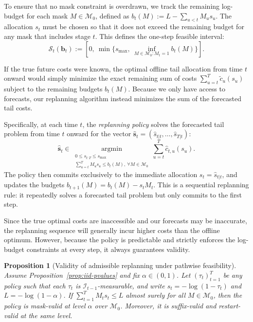 \documentclass{uai2026} %
\newtheorem{proposition}[theorem]{Proposition}
\newcommand{\1}{\mathbf{1}}
\newcommand{\scalt}{\mathcal{S}_{t}}
\newcommand{\mcal}{\mathcal{M}}
\newcommand{\argmin}{\operatorname*{argmin}}
\begin{document}
To ensure that no mask constraint is overdrawn, we track the remaining log-budget for each mask $M\in\mcal_{0}$, defined as $b_t(M) := L - \sum_{u < t} M_u s_u$.
The allocation $s_t$ must be chosen so that it does not exceed the remaining budget for any mask that includes stage $t$.
This defines the one-step feasible interval:
\begin{equation*}
  \scalt(\mathbf{b}_t)
  :=
  [0,\ \min\{s_{\max},\ \inf_{M\in\mcal_{0}: M_t=1} b_t(M)\}].
\end{equation*}

If the true future costs were known, the optimal offline tail allocation from time $t$ onward would simply minimize the exact remaining sum of costs $\sum_{u=t}^T \tilde{c}_u(s_u)$ subject to the remaining budgets $b_t(M)$.
Because we only have access to forecasts, our replanning algorithm instead minimizes the sum of the forecasted tail costs.

Specifically, at each time $t$, the \emph{replanning policy} solves the forecasted tail problem from time $t$ onward for the vector $\hat{\bm{s}}_t = (\hat{s}_{t|t}, \dots, \hat{s}_{T|t})$:
\begin{equation}
  \label{eq:replan-action}
  \hat{\bm{s}}_t \in \argmin_{\substack{0 \le s_{t:T} \le s_{\max}\\
  \sum_{u=t}^{T} M_u s_u \le b_t(M),\ \forall M \in \mcal_0}}
  \sum_{u=t}^{T} \hat{c}_{t,u}(s_u).
\end{equation}
The policy then commits exclusively to the immediate allocation $s_t = \hat{s}_{t|t}$, and updates the budgets $b_{t+1}(M)=b_t(M)-s_t M_t$.
This is a sequential replanning rule: it repeatedly solves a forecasted tail problem but only commits to the first step.

Since the true optimal costs are inaccessible and our forecasts may be inaccurate, the replanning sequence will generally incur higher costs than the offline optimum.
However, because the policy is predictable and strictly enforces the log-budget constraints at every step, it always guarantees validity.

\begin{proposition}[Validity of admissible replanning under pathwise feasibility]
  \label{prop:replan-validity}
  Assume Proposition~\ref{prop:iid-pvalues} and fix $\alpha\in(0,1)$.
  Let $(\tau_t)_{t=1}^{T}$ be any policy such that each $\tau_t$ is $\mathcal{I}_{t-1}$-measurable, and write $s_t=-\log(1-\tau_t)$ and $L=-\log(1-\alpha)$.
  If $\sum_{t=1}^{T} M_t s_t \le L$ almost surely for all $M\in\mcal_{0}$, then the policy is mask-valid at level $\alpha$ over $\mcal_{0}$.
  Moreover, it is suffix-valid and restart-valid at the same level.
\end{proposition}
\end{document}
